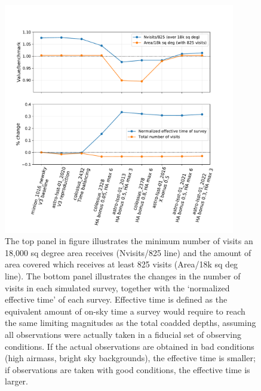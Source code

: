 \documentclass[DM,lsstdraft,authoryear,toc]{lsstdoc}
\begin{document}
\begin{figure}[ht]
\centering
\includegraphics[width=0.9\textwidth]{figures/srd}
\caption{The top panel in figure illustrates the minimum number of visits an 18,000 sq degree area receives (Nvisits/825 line) and the amount of area covered which receives at least 825 visits (Area/18k sq deg line).  The bottom panel illustrates the changes in the number of visits in each simulated survey, together with the `normalized effective time' of each survey. Effective time is defined as the equivalent amount of on-sky time a survey would require to reach the same limiting magnitudes as the total coadded depths, assuming all observations were actually taken in a fiducial set of observing conditions. If the actual observations are obtained in bad conditions (high airmass, bright sky backgrounds), the effective time is smaller; if observations are taken with good conditions, the effective time is larger.
\label{fig:srd}}
\end{figure}
\end{document}
